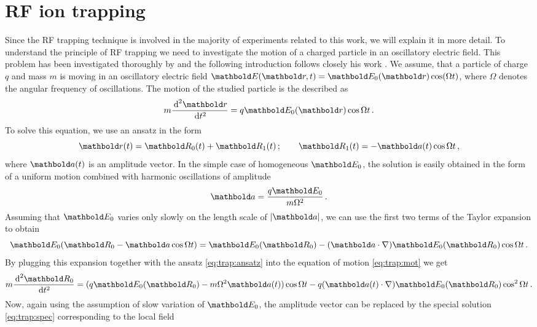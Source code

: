 \section{RF ion trapping}
\label{sec:trap}
Since the RF trapping technique is involved in the majority
of experiments related to this work, we will explain it in more
detail.
To understand the principle of RF trapping we need to investigate
the motion of a charged particle in an oscillatory electric field.
This problem has been investigated thoroughly by \cite{gerlich1992}
and the following introduction follows closely his work \citep{gerlich1992}.
We assume, that a particle of charge $q$ and mass $m$ is moving
in an
oscillatory electric field
$\mb E(\mb r, t) = \mb E_0(\mb r)\cos(\Omega t)$,
where $\Omega$ denotes the angular frequency of oscillations.
The motion of the studied particle is the described as
\begin{equation}
m\frac{\de^2 \mb r}{\de t^2} = 
q\mb E_0(\mb r)\cos\Omega t\,.
\label{eq:trap:mot}
\end{equation}
To solve this equation, we use an ansatz in the form
\begin{equation}
\mb r(t) = \mb R_0(t) + \mb R_1(t)\,;\qquad \mb R_1(t) = -\mb a(t)\cos\Omega t\,,
\label{eq:trap:ansatz}
\end{equation}
where $\mb a(t)$ is an amplitude vector.
In the simple case of homogeneous $\mb E_0$,
the solution is easily obtained in the form of
 a uniform motion combined with harmonic
oscillations of amplitude
\begin{equation}
\mb a = \frac{q\mb E_0}{m\Omega^2}\,.
\label{eq:trap:spec}
\end{equation}
Assuming that $\mb E_0$
varies only slowly on the length scale of $|\mb a|$, we can use
the first two terms of the Taylor expansion to obtain 
\begin{equation}
\mb E_0(\mb R_0-\mb a\cos\Omega t) = \mb E_0(\mb R_0) -
(\mb a\cdot\nabla)\mb E_0(\mb R_0)\cos \Omega t\,.
\end{equation}
By plugging this expansion together with the ansatz \eqref{eq:trap:ansatz}
into the equation of motion \eqref{eq:trap:mot} we get
\begin{equation}
m\frac{\de^2\mb R_0}{\de t^2} =
(q\mb E_0(\mb R_0) - 
 m\Omega^2\mb a(t))\cos\Omega t -
q(\mb a(t)\cdot\nabla)\mb E_0(\mb R_0)\cos^2\Omega t\,.
\end{equation}
Now, again using the assumption of slow variation of $\mb E_0$,
the amplitude vector can be replaced by the special solution
\eqref{eq:trap:spec} corresponding to the local field \ie\
